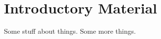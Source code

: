 \chapter{Introductory Material}
\label{chapterlabel1}

Some stuff about things.\cite{example-citation} Some more things. 


\blindtext
